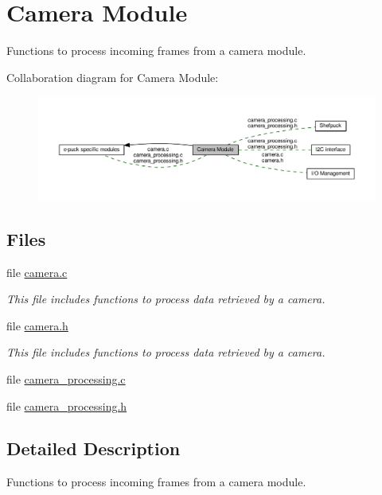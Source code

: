 \hypertarget{group__camera}{}\section{Camera Module}
\label{group__camera}


Functions to process incoming frames from a camera module.  


Collaboration diagram for Camera Module\+:\nopagebreak
\begin{figure}[H]
\begin{center}
\leavevmode
\includegraphics[width=350pt]{dc/d90/group__camera}
\end{center}
\end{figure}
\subsection*{Files}
\begin{DoxyCompactItemize}
\item 
file \hyperlink{camera_8c}{camera.\+c}
\begin{DoxyCompactList}\small\item\em This file includes functions to process data retrieved by a camera. \end{DoxyCompactList}\item 
file \hyperlink{camera_8h}{camera.\+h}
\begin{DoxyCompactList}\small\item\em This file includes functions to process data retrieved by a camera. \end{DoxyCompactList}\item 
file \hyperlink{camera__processing_8c}{camera\+\_\+processing.\+c}
\item 
file \hyperlink{camera__processing_8h}{camera\+\_\+processing.\+h}
\end{DoxyCompactItemize}


\subsection{Detailed Description}
Functions to process incoming frames from a camera module. 

